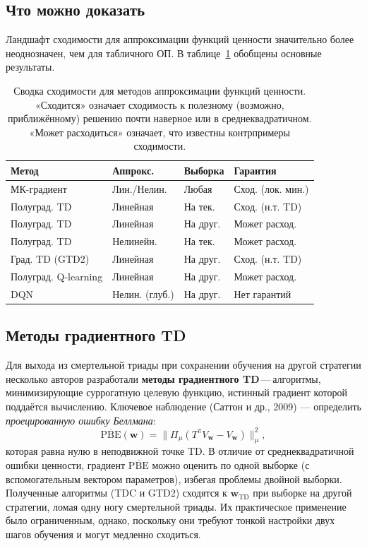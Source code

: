 \subsection{Что можно доказать}

Ландшафт сходимости для аппроксимации функций ценности значительно более неоднозначен, чем для табличного ОП.  В таблице~\ref{tab:convergence-summary} обобщены основные результаты.

\begin{table}[ht]
\centering
\caption{Сводка сходимости для методов аппроксимации функций ценности.  «Сходится» означает сходимость к полезному (возможно, приближённому) решению почти наверное или в среднеквадратичном.  «Может расходиться» означает, что известны контрпримеры сходимости.}
\label{tab:convergence-summary}
\footnotesize
\renewcommand{\arraystretch}{1.2}
\begin{tabular}{@{}llp{2.1cm}p{2.3cm}@{}}
\toprule
\textbf{Метод} & \textbf{Аппрокс.} & \textbf{Выборка} & \textbf{Гарантия} \\
\midrule
МК-градиент & Лин./Нелин. & Любая & Сход. (лок. мин.) \\
Полуград. TD & Линейная & На тек. & Сход. (н.т. TD) \\
Полуград. TD & Линейная & На друг. & Может расход. \\
Полуград. TD & Нелинейн. & На тек. & Может расход. \\
Град. TD (GTD2) & Линейная & На друг. & Сход. (н.т. TD) \\
Полуград. Q-learning & Линейная & На друг. & Может расход. \\
DQN & Нелин. (глуб.) & На друг. & Нет гарантий \\
\bottomrule
\end{tabular}
\end{table}

\subsection{Методы градиентного TD}

Для выхода из смертельной триады при сохранении обучения на другой стратегии несколько авторов разработали \textbf{методы градиентного TD}\,---\,алгоритмы, минимизирующие суррогатную целевую функцию, истинный градиент которой поддаётся вычислению.  Ключевое наблюдение (Саттон и др., 2009) --- определить \emph{проецированную ошибку Беллмана}:
\[
\overline{\mathrm{PBE}}(\mathbf{w}) = \|\Pi_\mu(T^\pi V_\mathbf{w} - V_\mathbf{w})\|_\mu^2,
\]
которая равна нулю в неподвижной точке TD.  В отличие от среднеквадратичной ошибки ценности, градиент $\overline{\mathrm{PBE}}$ можно оценить по одной выборке (с вспомогательным вектором параметров), избегая проблемы двойной выборки.  Полученные алгоритмы (TDC и GTD2) сходятся к $\mathbf{w}_{\mathrm{TD}}$ при выборке на другой стратегии, ломая одну ногу смертельной триады.  Их практическое применение было ограниченным, однако, поскольку они требуют тонкой настройки двух шагов обучения и могут медленно сходиться.

